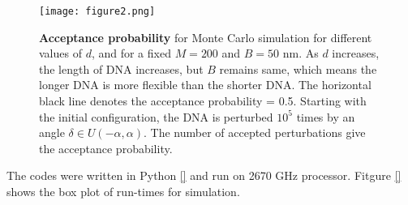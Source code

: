 \documentclass{scrartcl}
\begin{document}
\begin{enumerate}
\begin{figure}[b]
\label{figure2}
\centering
\texttt{[image: figure2.png]}
\caption{\textbf{Acceptance probability} for Monte Carlo simulation for different values of $d$, and for a fixed $M = 200$ and $B = 50$ nm. As $d$ increases, the length of DNA increases, but $B$ remains same, which means the longer DNA is more flexible than the shorter DNA. The horizontal black line denotes the acceptance probability = 0.5. Starting with the initial configuration, the DNA is perturbed $10^5$ times by an angle $\delta \in U(-\alpha,\alpha)$. The number of accepted perturbations give the acceptance probability.}
\end{figure}


The codes were written in Python \ref{} and run on 2670 GHz processor. Fitgure \ref{} shows the box plot of run-times for simulation.
\end{enumerate}

\end{document}
